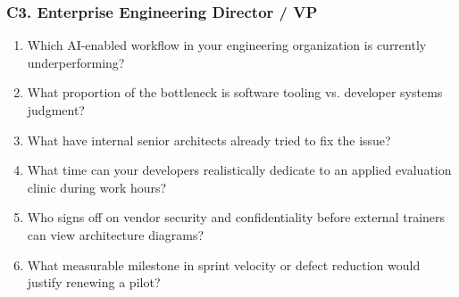 \subsubsection*{C3. Enterprise Engineering Director / VP}
\begin{enumerate}[leftmargin=1.2em,itemsep=0.2ex]
  \item Which AI-enabled workflow in your engineering organization is currently underperforming?
  \item What proportion of the bottleneck is software tooling vs. developer systems judgment?
  \item What have internal senior architects already tried to fix the issue?
  \item What time can your developers realistically dedicate to an applied evaluation clinic during work hours?
  \item Who signs off on vendor security and confidentiality before external trainers can view architecture diagrams?
  \item What measurable milestone in sprint velocity or defect reduction would justify renewing a pilot?
\end{enumerate}
